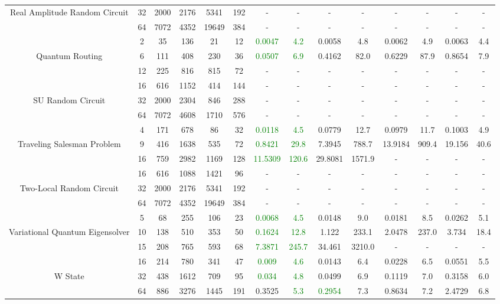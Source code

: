 \begin{table}[htb]
{\begin{tabular}{|c|c|c|c|c|c|c|c|c|c|c|c|c|c|}
Real Amplitude Random Circuit & 
32 & 2000 & 2176 & 5341 & 192
 & - & -
 & - & -
 & - & -
 & - & -
 \\
 & 
64 & 7072 & 4352 & 19649 & 384
 & - & -
 & - & -
 & - & -
 & - & -
 \\
\hline
 & 
2 & 35 & 136 & 21 & 12
 & \textcolor{green}{0.0047} & \textcolor{green}{4.2}
 & 0.0058 & 4.8
 & 0.0062 & 4.9
 & 0.0063 & 4.4
 \\
Quantum Routing & 
6 & 111 & 408 & 230 & 36
 & \textcolor{green}{0.0507} & \textcolor{green}{6.9}
 & 0.4162 & 82.0
 & 0.6229 & 87.9
 & 0.8654 & 7.9
 \\
 & 
12 & 225 & 816 & 815 & 72
 & - & -
 & - & -
 & - & -
 & - & -
 \\
\hline
 & 
16 & 616 & 1152 & 414 & 144
 & - & -
 & - & -
 & - & -
 & - & -
 \\
SU Random Circuit & 
32 & 2000 & 2304 & 846 & 288
 & - & -
 & - & -
 & - & -
 & - & -
 \\
 & 
64 & 7072 & 4608 & 1710 & 576
 & - & -
 & - & -
 & - & -
 & - & -
 \\
\hline
 & 
4 & 171 & 678 & 86 & 32
 & \textcolor{green}{0.0118} & \textcolor{green}{4.5}
 & 0.0779 & 12.7
 & 0.0979 & 11.7
 & 0.1003 & 4.9
 \\
Traveling Salesman Problem & 
9 & 416 & 1638 & 535 & 72
 & \textcolor{green}{0.8421} & \textcolor{green}{29.8}
 & 7.3945 & 788.7
 & 13.9184 & 909.4
 & 19.156 & 40.6
 \\
 & 
16 & 759 & 2982 & 1169 & 128
 & \textcolor{green}{11.5309} & \textcolor{green}{120.6}
 & 29.8081 & 1571.9
 & - & -
 & - & -
 \\
\hline
 & 
16 & 616 & 1088 & 1421 & 96
 & - & -
 & - & -
 & - & -
 & - & -
 \\
Two-Local Random Circuit & 
32 & 2000 & 2176 & 5341 & 192
 & - & -
 & - & -
 & - & -
 & - & -
 \\
 & 
64 & 7072 & 4352 & 19649 & 384
 & - & -
 & - & -
 & - & -
 & - & -
 \\
\hline
 & 
5 & 68 & 255 & 106 & 23
 & \textcolor{green}{0.0068} & \textcolor{green}{4.5}
 & 0.0148 & 9.0
 & 0.0181 & 8.5
 & 0.0262 & 5.1
 \\
Variational Quantum Eigensolver & 
10 & 138 & 510 & 353 & 50
 & \textcolor{green}{0.1624} & \textcolor{green}{12.8}
 & 1.122 & 233.1
 & 2.0478 & 237.0
 & 3.734 & 18.4
 \\
 & 
15 & 208 & 765 & 593 & 68
 & \textcolor{green}{7.3871} & \textcolor{green}{245.7}
 & 34.461 & 3210.0
 & - & -
 & - & -
 \\
\hline
 & 
16 & 214 & 780 & 341 & 47
 & \textcolor{green}{0.009} & \textcolor{green}{4.6}
 & 0.0143 & 6.4
 & 0.0228 & 6.5
 & 0.0551 & 5.5
 \\
W State & 
32 & 438 & 1612 & 709 & 95
 & \textcolor{green}{0.034} & \textcolor{green}{4.8}
 & 0.0499 & 6.9
 & 0.1119 & 7.0
 & 0.3158 & 6.0
 \\
 & 
64 & 886 & 3276 & 1445 & 191
 & 0.3525 & \textcolor{green}{5.3}
 & \textcolor{green}{0.2954} & 7.3
 & 0.8634 & 7.2
 & 2.4729 & 6.8
 \\
\hline
\end{tabular}}
\end{table}